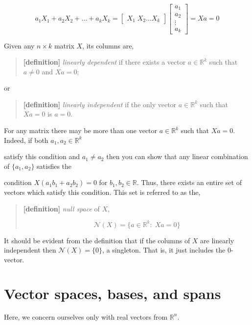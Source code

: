 \documentclass[
  letterpaper,
  DIV=11,
  numbers=noendperiod]{scrreprt}
\begin{document}
\[
a_1X_1 + a_2X_2+\ldots+a_kX_k=\begin{bmatrix} X_1\;X_2 \dots X_k\end{bmatrix}\begin{bmatrix}a_1\\a_2\\\vdots\\a_k\end{bmatrix}=Xa = 0
\]

Given any \(n\times k\) matrix \(X\), its columns are,

\begin{quote}
\textbf{{[}definition{]}} \emph{linearly dependent} if there exists a
vector \(a\in\mathbb{R}^k\) such that \(a\neq0\) and \(Xa=0\);
\end{quote}

or

\begin{quote}
\textbf{{[}definition{]}} \emph{linearly independent} if the only vector
\(a\in\mathbb{R}^k\) such that \(Xa=0\) is \(a=0\).
\end{quote}

For any matrix there may be more than one vector \(a\in\mathbb{R}^{k}\)
such that \(Xa=0\). Indeed, if both \(a_{1},a_{2}\in\mathbb{R}^{k}\)

satisfy this condition and \(a_{1}\neq a_{2}\) then you can show that
any linear combination of \(\{a_{1},a_{2}\}\) satisfies the

condition \(X(a_{1}b_{1}+a_{2}b_{2})=0\) for
\(b_{1},b_{2}\in\mathbb{R}\). Thus, there exists an entire set of
vectors which satisfy this condition. This set is referred to as the,

\begin{quote}
\textbf{{[}definition{]}} \emph{null space} of \(X\),

\[
\mathcal{N}(X) = \{a\in\mathbb{R}^k:\;Xa=0\}
\]
\end{quote}

It should be evident from the definition that if the columns of \(X\)
are linearly independent then \(\mathcal{N}(X)=\{0\}\), a singleton.
That is, it just includes the 0-vector.

\hypertarget{vector-spaces-bases-and-spans}{%
\section{Vector spaces, bases, and
spans}\label{vector-spaces-bases-and-spans}}

Here, we concern ourselves only with real vectors from \(\mathbb{R}^n\).
\end{document}
